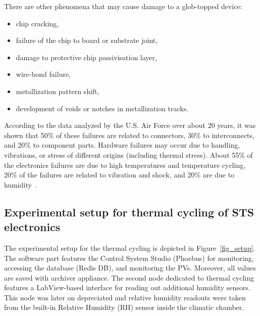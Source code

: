 \newpage


There are other phenomena that may cause damage to a glob-topped device:
\begin{itemize}
    \item chip cracking,
    \item failure of the chip to board or substrate joint,
    \item damage to protective chip passivisation layer,
    \item wire-bond failure,
    \item metallization pattern shift,
    \item development of voids or notches in metallization tracks. 
\end{itemize}


According to the data analyzed by the U.S. Air Force over about 20 years, it was shown that 50\% of these failures are related to connectors, 30\% to interconnects, and 20\% to component
parts. Hardware failures may occur due to handling, vibrations, or stress of different origins (including thermal stress). About 55\% of the electronics failures are due to high temperatures and temperature cycling, 20\% of the failures are related to vibration and shock, and 20\% are due to humidity~\cite{thermal_electronics}. 




\subsection{Experimental setup for thermal cycling of STS electronics}
\label{cycling_setup}
The experimental setup for the thermal cycling is depicted in Figure~\ref{fig_setup}. The software part features the Control System Studio (Phoebus) for monitoring, accessing the database (Redis DB), and monitoring the \gls{PV}s. Moreover, all values are saved with archiver appliance. The second node dedicated to thermal cycling features a LabView-based interface for reading out additional humidity sensors. This node was later on depreciated and relative humidity readouts were taken from the built-in Relative Humidity (\gls{RH}) sensor inside the climatic chamber.

